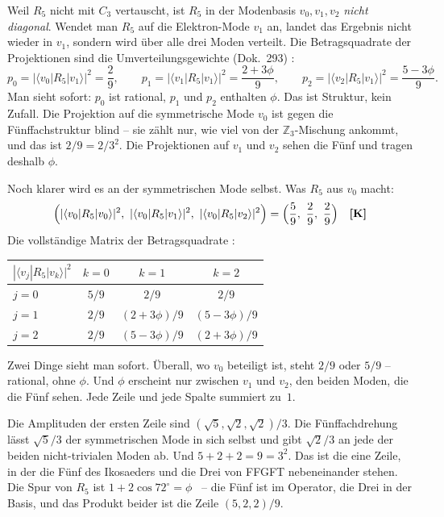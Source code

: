 Weil $R_5$ nicht mit $C_3$ vertauscht, ist $R_5$ in der Modenbasis
$v_0,v_1,v_2$ \emph{nicht diagonal}. Wendet man $R_5$ auf die Elektron-Mode
$v_1$ an, landet das Ergebnis nicht wieder in $v_1$, sondern wird über alle
drei Moden verteilt. Die Betragsquadrate der Projektionen sind die
Umverteilungsgewichte (Dok.~293) \BM:
\[
  p_0 = |\langle v_0|R_5|v_1\rangle|^2 = \frac{2}{9}, \qquad
  p_1 = |\langle v_1|R_5|v_1\rangle|^2 = \frac{2+3\phi}{9}, \qquad
  p_2 = |\langle v_2|R_5|v_1\rangle|^2 = \frac{5-3\phi}{9}.
\]
Man sieht sofort: $p_0$ ist rational, $p_1$ und $p_2$ enthalten $\phi$. Das ist
Struktur, kein Zufall. Die Projektion auf die symmetrische Mode $v_0$ ist gegen
die Fünffachstruktur blind -- sie zählt nur, wie viel von der
$\mathbb{Z}_3$-Mischung ankommt, und das ist $2/9 = 2/3^2$. Die Projektionen auf
$v_1$ und $v_2$ sehen die Fünf und tragen deshalb $\phi$.

Noch klarer wird es an der symmetrischen Mode selbst. Was $R_5$ aus $v_0$ macht:
\[
  \Bigl(|\langle v_0|R_5|v_0\rangle|^2,\ |\langle v_0|R_5|v_1\rangle|^2,\
  |\langle v_0|R_5|v_2\rangle|^2\Bigr) = \Bigl(\frac{5}{9},\ \frac{2}{9},\ \frac{2}{9}\Bigr) \quad \KM
\]
Die vollständige Matrix der Betragsquadrate \KM:
\begin{center}
\begin{tabular}{@{}l|ccc@{}}
\toprule
$|\langle v_j|R_5|v_k\rangle|^2$ & $k=0$ & $k=1$ & $k=2$ \\
\midrule
$j=0$ & $5/9$ & $2/9$ & $2/9$ \\
$j=1$ & $2/9$ & $(2+3\phi)/9$ & $(5-3\phi)/9$ \\
$j=2$ & $2/9$ & $(5-3\phi)/9$ & $(2+3\phi)/9$ \\
\bottomrule
\end{tabular}
\end{center}
Zwei Dinge sieht man sofort. Überall, wo $v_0$ beteiligt ist, steht $2/9$
oder $5/9$ -- rational, ohne $\phi$. Und $\phi$ erscheint nur zwischen $v_1$
und $v_2$, den beiden Moden, die die Fünf sehen. Jede Zeile und jede Spalte
summiert zu~$1$.

Die Amplituden der ersten Zeile sind $(\sqrt5,\sqrt2,\sqrt2)/3$. Die Fünffachdrehung lässt
$\sqrt5/3$ der symmetrischen Mode in sich selbst und gibt $\sqrt2/3$ an jede der
beiden nicht-trivialen Moden ab. Und $5+2+2 = 9 = 3^2$. Das ist die eine Zeile,
in der die Fünf des Ikosaeders und die Drei von FFGFT nebeneinander stehen. Die
Spur von $R_5$ ist $1 + 2\cos72^\circ = \phi$ \EM~-- die Fünf ist im Operator, die
Drei in der Basis, und das Produkt beider ist die Zeile $(5,2,2)/9$.

